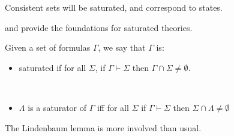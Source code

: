 \documentclass[10pt]{article}
\begin{document}
Consistent sets will be saturated, and correspond to states.

\textcite{Thomason:1968aa} and \textcite{Aczel:1968aa} provide the foundations for saturated theories.

\begin{definition}[Saturation]
  Given a set of formulas \(\Gamma\), we say that \(\Gamma\) is:
  \begin{itemize}
  \item saturated if for all \(\Sigma\), if \(\Gamma \vdash \Sigma\) then \(\Gamma \cap \Sigma \ne \emptyset\).
  \end{itemize}
\end{definition}

\begin{definition}[Saturators]
  \mbox{ }
  \begin{itemize}
  \item \(\Lambda\) is a saturator of \(\Gamma\) iff for all \(\Sigma\) if \(\Gamma \vdash \Sigma\) then \(\Sigma \cap \Lambda \ne \emptyset\)
  \end{itemize}
\end{definition}


The Lindenbaum lemma is more involved than usual.
\end{document}
